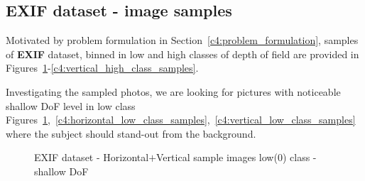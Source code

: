 \subsection{EXIF dataset - image samples}
\label{c4:exif_samples}

Motivated by problem formulation in Section~\ref{c4:problem_formulation}, samples of \textbf{EXIF} dataset, binned in low and high classes of depth of field are provided in Figures~\ref{c4:all_low_class_samples}-\ref{c4:vertical_high_class_samples}.



Investigating the sampled photos, we are looking for pictures with noticeable shallow DoF level in low class Figures~\ref{c4:all_low_class_samples},~\ref{c4:horizontal_low_class_samples},~\ref{c4:vertical_low_class_samples} where the subject should stand-out from the background.

\begin{figure}[ht!]
    \centering  
    \caption{EXIF dataset - Horizontal$+$Vertical sample images low(0) class - shallow DoF}
    \label{c4:all_low_class_samples}
\end{figure}


